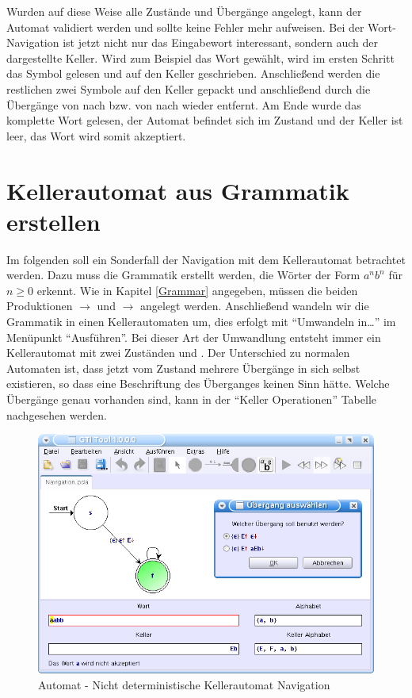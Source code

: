 Wurden auf diese Weise alle Zustände und Übergänge angelegt, kann der Automat
validiert werden und sollte keine Fehler mehr aufweisen. Bei der Wort-
Navigation ist jetzt nicht nur das Eingabewort interessant, sondern auch der
dargestellte Keller. Wird zum Beispiel das Wort  gewählt, wird im
ersten Schritt das Symbol  gelesen und auf den Keller geschrieben.
Anschließend werden die restlichen zwei Symbole  auf den Keller
gepackt und anschließend durch die Übergänge von  nach 
bzw. von  nach  wieder entfernt. Am Ende wurde das
komplette Wort  gelesen, der Automat befindet sich im Zustand
 und der Keller ist leer, das Wort wird somit akzeptiert.


\section{Kellerautomat aus Grammatik erstellen}

Im folgenden soll ein Sonderfall der Navigation mit dem Kellerautomat betrachtet
werden. Dazu muss die Grammatik erstellt werden, die Wörter der Form $a^n b^n$
für $n \geq 0$ erkennt. Wie in Kapitel \ref{Grammar} angegeben, müssen die beiden
Produktionen  $\to$ \TerminalSymbol{$\epsilon$} und
 $\to$ 
angelegt werden. Anschließend wandeln wir die Grammatik in einen
Kellerautomaten um, dies erfolgt mit "`Umwandeln in\ldots"' im Menüpunkt
"`Ausführen"'. Bei dieser Art der Umwandlung entsteht immer ein Kellerautomat
mit zwei Zuständen  und . Der Unterschied zu normalen
Automaten ist, dass jetzt vom Zustand  mehrere Übergänge in sich
selbst existieren, so dass eine Beschriftung des Überganges keinen Sinn hätte.
Welche Übergänge genau vorhanden sind, kann in der "`Keller Operationen"'
Tabelle nachgesehen werden.\vspace{10pt}

\begin{figure}[h]
\begin{center}
\includegraphics[width=12cm]{../images/grammar_pda.png}
\caption{Automat - Nicht deterministische Kellerautomat Navigation}
\end{center}
\end{figure}

